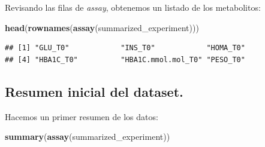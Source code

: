 \documentclass[
]{article}
\newenvironment{Shaded}{\begin{snugshade}}{\end{snugshade}}
\newcommand{\FunctionTok}[1]{\textcolor[rgb]{0.13,0.29,0.53}{\textbf{#1}}}
\newcommand{\NormalTok}[1]{#1}
\begin{document}
Revisando las filas de \emph{assay}, obtenemos un listado de los
metabolitos:

\begin{Shaded}
\begin{Highlighting}[]
\FunctionTok{head}\NormalTok{(}\FunctionTok{rownames}\NormalTok{(}\FunctionTok{assay}\NormalTok{(summarized\_experiment)))}
\end{Highlighting}
\end{Shaded}

\begin{verbatim}
## [1] "GLU_T0"            "INS_T0"            "HOMA_T0"          
## [4] "HBA1C_T0"          "HBA1C.mmol.mol_T0" "PESO_T0"
\end{verbatim}

\subsection{Resumen inicial del
dataset.}\label{resumen-inicial-del-dataset.}

Hacemos un primer resumen de los datos:

\begin{Shaded}
\begin{Highlighting}[]
\FunctionTok{summary}\NormalTok{(}\FunctionTok{assay}\NormalTok{(summarized\_experiment))}
\end{Highlighting}
\end{Shaded}
\end{document}

